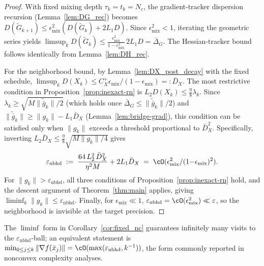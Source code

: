 \documentclass[review,onefignum,onetabnum]{siamart171218}
\begin{document}
	\begin{proof}
		With fixed mixing depth $\tau_k=t_k=N_c$, the gradient-tracker
		dispersion recursion (Lemma~\ref{lem:DG_rec}) becomes
		$D(\tilde G_{k+1})\le\epsilon_{\mathrm{mix}}^2(D(\tilde G_k)+2L_1D)$.
		Since $\epsilon_{\mathrm{mix}}^2<1$, iterating the geometric series yields
		$\limsup_{k}D(\tilde G_k)\le \frac{\epsilon_{\mathrm{mix}}^2}{1-\epsilon_{\mathrm{mix}}^2}\,2L_1D
		=\bar\Delta_G$.
		The Hessian-tracker bound follows identically from Lemma~\ref{lem:DH_rec}.
		
		For the neighborhood bound, by Lemma~\ref{lem:DX_post_decay} with the fixed schedule,
		$\limsup_k D(X_k)\le C_X^{+}\epsilon_{\mathrm{mix}}/(1-\epsilon_{\mathrm{mix}})=:\bar D_X$.
		The most restrictive condition in Proposition~\ref{prop:inexact-rn}
		is $L_2 D(X_k)\le\frac{\eta}{8}\lambda_k$.
		Since $\lambda_k\ge\sqrt{M\|\tilde{\bar g}_k\|/2}$
		(which holds once $\bar\Delta_G\le\|\tilde{\bar g}_k\|/2$) and
		$\|\tilde{\bar g}_k\|\ge\|g_k\|-L_1\bar D_X$
		(Lemma~\ref{lem:bridge-grad}), this condition can be satisfied only when
		$\|g_k\|$ exceeds a threshold proportional to $\bar D_X^2$.
		Specifically, inverting $L_2\bar D_X\le\frac{\eta}{8}\sqrt{M\|g_k\|/4}$
		gives
		\[
		\varepsilon_{\mathrm{nbhd}}
		\;:=\;
		\frac{64\,L_2^2\,\bar D_X^2}{\eta^2 M}
		+2L_1\bar D_X
		\;=\;\cO(\epsilon_{\mathrm{mix}}^2/(1{-}\epsilon_{\mathrm{mix}})^2).
		\]
		For $\|g_k\|>\varepsilon_{\mathrm{nbhd}}$, all three conditions of
		Proposition~\ref{prop:inexact-rn} hold, and the descent
		argument of Theorem~\ref{thm:main} applies,
		giving $\liminf_k\|g_k\|\le\varepsilon_{\mathrm{nbhd}}$.
		Finally, for $\epsilon_{\mathrm{mix}}\ll 1$,
		$\varepsilon_{\mathrm{nbhd}}=\cO(\epsilon_{\mathrm{mix}}^2)\ll\varepsilon$,
		so the neighborhood is invisible at the target precision.
	\end{proof}
	
	\begin{remark}\label{rem:liminf_form}
		The $\liminf$ form in Corollary~\ref{cor:fixed_nc} guarantees infinitely many visits to
		the $\varepsilon_{\mathrm{nbhd}}$-ball; an equivalent statement is
		$\min_{0\le j\le k}\|\nabla f(\bar x_j)\|
		=\cO(\max(\varepsilon_{\mathrm{nbhd}}, k^{-1}))$,
		the form commonly reported in nonconvex complexity analyses.
	\end{remark}
	
\end{document}
